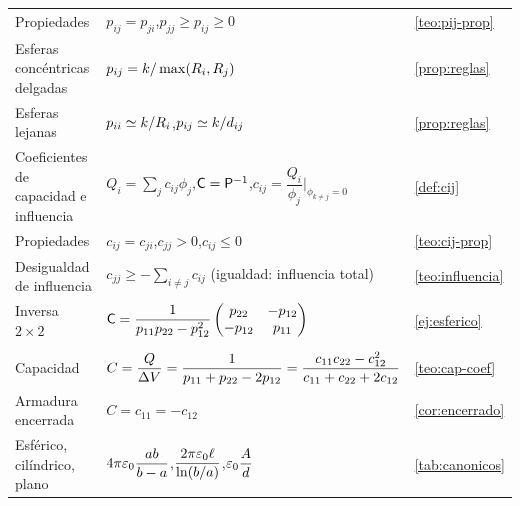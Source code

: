 \begin{tabularx}{\linewidth}{@{}>{\raggedright\arraybackslash}p{4.3cm}>{\centering\arraybackslash}X>{\raggedleft\arraybackslash}p{2.45cm}@{}}
  Propiedades & $p_{ij}=p_{ji}$,\quad $p_{jj}\ge p_{ij}\ge0$ & \cref{teo:pij-prop}\\
  Esferas concéntricas delgadas & $p_{ij}=k/\max(R_i,R_j)$ & \cref{prop:reglas}\\
  Esferas lejanas & $p_{ii}\simeq k/R_i$,\quad $p_{ij}\simeq k/d_{ij}$ & \cref{prop:reglas}\\
  Coeficientes de capacidad e influencia & $Q_i=\sum_jc_{ij}\phi_j$,\quad $\mathsf{C}=\mathsf{P}^{-1}$,\quad $c_{ij}=\dfrac{Q_i}{\phi_j}\Big|_{\phi_{k\neq j}=0}$ & \cref{def:cij}\\
  Propiedades & $c_{ij}=c_{ji}$,\quad $c_{jj}>0$,\quad $c_{ij}\le0$ & \cref{teo:cij-prop}\\
  Desigualdad de influencia & $c_{jj}\ge-\sum_{i\neq j}c_{ij}$ (igualdad: influencia total) & \cref{teo:influencia}\\
  Inversa $2\times2$ & $\mathsf{C}=\dfrac{1}{p_{11}p_{22}-p_{12}^{2}}\begin{pmatrix}p_{22}&-p_{12}\\-p_{12}&p_{11}\end{pmatrix}$ & \cref{ej:esferico}\\
  \midrule
  \multicolumn{3}{@{}l}{\textsc{\color{azulmedio}Condensadores}}\\
  Capacidad & $C=\dfrac{Q}{\Delta V}=\dfrac{1}{p_{11}+p_{22}-2p_{12}}=\dfrac{c_{11}c_{22}-c_{12}^{2}}{c_{11}+c_{22}+2c_{12}}$ & \cref{teo:cap-coef}\\
  Armadura encerrada & $C=c_{11}=-c_{12}$ & \cref{cor:encerrado}\\
  Esférico, cilíndrico, plano & $4\pi\varepsilon_{0}\dfrac{ab}{b-a}$,\quad $\dfrac{2\pi\varepsilon_{0}\ell}{\ln(b/a)}$,\quad $\varepsilon_{0}\dfrac{A}{d}$ & \cref{tab:canonicos}\\
  \bottomrule
\end{tabularx}
\par\endgroup
